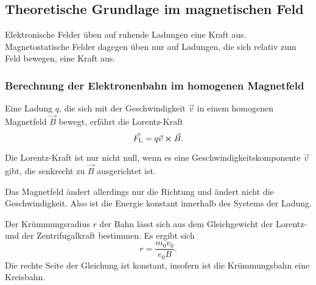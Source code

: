 \subsection{Theoretische Grundlage im magnetischen Feld}
Elektronische Felder üben auf ruhende Ladungen 
eine Kraft aus. Magnetostatische Felder dagegen üben nur auf 
Ladungen, die sich relativ zum Feld bewegen, eine Kraft aus.

\subsubsection{Berechnung der Elektronenbahn im homogenen Magnetfeld}
Eine Ladung $q$, die sich mit der Geschwindigkeit $\vec{v}$ in 
einem homogenen Magnetfeld $\vec{B}$ bewegt, erfährt die Lorentz-Kraft 
\begin{equation}
    \vec{F_\text{L}}= q \vec{v} \cross \vec{B}.
    \label{eqn:Lorentz}
\end{equation}

\noindent Die Lorentz-Kraft ist nur nicht null, wenn es eine 
Geschwindigkeitskomponente $\vec{v}$ gibt, die senkrecht zu 
$\vec{B}$ ausgerichtet ist. 

\noindent Das  Magnetfeld ändert allerdings nur die Richtung und ändert 
nicht die Geschwindigkeit. Also ist die Energie konstant 
innerhalb des Systems der Ladung.

\noindent Der Krümmungsradius $r$ der Bahn lässt sich aus dem Gleichgewicht der 
Lorentz- und der Zentrifugalkraft bestimmen. Es ergibt sich 
\begin{equation}
    r= \frac{m_\text{0}v_\text{0}}{e_\text{0} B}.
    \label{eqn:radius}
\end{equation}
Die rechte Seite der Gleichung ist konstant, insofern ist die 
Krümmungsbahn eine Kreisbahn. 

